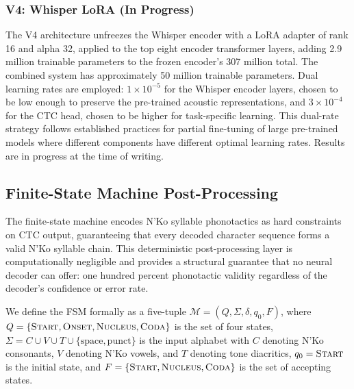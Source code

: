 \documentclass[11pt]{article}
\newcommand{\nko}{N'Ko}
\begin{document}
\subsubsection{V4: Whisper LoRA (In Progress)}

The V4 architecture unfreezes the Whisper encoder with a LoRA adapter of rank 16 and alpha 32, applied to the top eight encoder transformer layers, adding 2.9 million trainable parameters to the frozen encoder's 307 million total. The combined system has approximately 50 million trainable parameters. Dual learning rates are employed: $1 \times 10^{-5}$ for the Whisper encoder layers, chosen to be low enough to preserve the pre-trained acoustic representations, and $3 \times 10^{-4}$ for the CTC head, chosen to be higher for task-specific learning. This dual-rate strategy follows established practices for partial fine-tuning of large pre-trained models where different components have different optimal learning rates. Results are in progress at the time of writing.

\subsection{Finite-State Machine Post-Processing}
\label{sec:fsm}

The finite-state machine encodes \nko{} syllable phonotactics as hard constraints on CTC output, guaranteeing that every decoded character sequence forms a valid \nko{} syllable chain. This deterministic post-processing layer is computationally negligible and provides a structural guarantee that no neural decoder can offer: one hundred percent phonotactic validity regardless of the decoder's confidence or error rate.

We define the FSM formally as a five-tuple $\mathcal{M} = (Q, \Sigma, \delta, q_0, F)$, where $Q = \{\textsc{Start}, \textsc{Onset}, \textsc{Nucleus}, \textsc{Coda}\}$ is the set of four states, $\Sigma = C \cup V \cup T \cup \{\text{space}, \text{punct}\}$ is the input alphabet with $C$ denoting \nko{} consonants, $V$ denoting \nko{} vowels, and $T$ denoting tone diacritics, $q_0 = \textsc{Start}$ is the initial state, and $F = \{\textsc{Start}, \textsc{Nucleus}, \textsc{Coda}\}$ is the set of accepting states.
\end{document}
